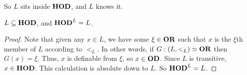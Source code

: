 So $L$ sits inside $\mathbf{HOD}$, and $L$ knows it.

\begin{boxtheorem}
    $L \subseteq \mathbf{HOD}$, and $\mathbf{HOD}^L = L$.
\end{boxtheorem}
\begin{proof}
    Note that given any $x \in L$, we have some $\xi \in \mathbf{OR}$ such that $x$ is the $\xi$th member of $L$ according to $<_L$. In other words, if $G : (L, <_L) \simeq \mathbf{OR}$ then $G(x) = \xi$. Thus, $x$ is definable from $\xi$, so $x \in \mathbf{OD}$. Since $L$ is transitive, $x \in \mathbf{HOD}$. This calculation is absolute down to $L$. So $\mathbf{HOD}^L = L$.
\end{proof}
